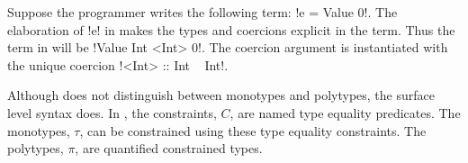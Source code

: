 \documentclass[screen,nonacm,manuscript,review]{acmart} %
\begin{document}
Suppose the programmer writes the following term: !e = Value 0!.
The elaboration of !e! in \SFC makes the types and coercions explicit in the term.
Thus the term in \SFC will be !Value Int <Int> 0!. The coercion argument
is instantiated with the unique coercion !<Int> :: Int ~ Int!.

Although \SFC does not distinguish
between monotypes and polytypes, the surface level syntax does.
In , the constraints, $C$, are named type equality
predicates. The monotypes, $\tau$, can be constrained using these type
equality constraints. The polytypes, $\pi$, are quantified constrained types.

\newcommand\GADTVar{
 \ib{\irule[\trule{g-var}]
 {x\co\pi \in \TEnv};
 {\GTranslate C \TEnv x {\pi} x}
 }
}
\newcommand\GADTEq{
 \ib{\irule[\trule{g-eq}]
 {\GTranslate C \TEnv \Tm \tau \Tm'}
 {\CoKinding C \Co {\tau \sim \tau'}};
 {\GTranslate C \TEnv \Tm {\tau'} {\Cast {\Tm'} \Co}}
 }
}
\newcommand\GADTForallI{
 \ib{\irule[\trule{g-$\I\forall$}]
 {\GTranslate C \TEnv \Tm \pi \Tm'}
 {\fresh \TyVar {C, \TEnv}};
 {\GTranslate C \TEnv \Tm {\Forall {\TyVar\co\star} \pi} {\TLam {\TyVar\co\star} \Tm'}}
 }
}
\newcommand\GADTForallE{
 \ib{\irule[\trule{g-$\E\forall$}]
 {\GTranslate C \TEnv \Tm {\Forall {\TyVar\co\star} \pi} \Tm'};
 {\GTranslate C \TEnv \Tm {\Set{\TyVar\mapsto\tau}\pi} {\Tm'\App \tau}}
 }
}
\newcommand\GADTCI{
 \ib{\irule[\trule{g-$\I C$}]
 {\GTranslate {C,c:\tau\sim\tau'} \TEnv \Tm {\eta} \Tm'};
 {\GTranslate C \TEnv \Tm {\tau\sim\tau'\then\eta} {\TLam {(c\co\tau\sim\tau')} \Tm'}}
 }
}
\newcommand\GADTCE{
 \ib{\irule[\trule{g-$\E C$}]
 {\GTranslate {C} \TEnv \Tm {\tau\sim\tau'\then\eta} \Tm'}
 {\CoKinding C \Co \tau\sim\tau'};
 {\GTranslate C \TEnv \Tm {\eta} {\Tm'\App\Co}}
 }
}
\newcommand\GADTAlt{
 \ib{\irule[\trule{g-alt}]
 {\substack{
 \mathlarger{H\co \Forall {\many\TyVar} {\Forall {\many\beta} {\many{\tau'\sim\tau''} \then \many\tau \to T\many\TyVar}}}\quad
 \mathlarger{\many\TyVar \cap \many\beta = \varnothing}\quad
 \mathlarger{\fvs{\many\tau, \many{\tau'}, \many{\tau''}} = \fvs{\many\TyVar, \many\beta}}\quad
 \mathlarger{\Subst = \Set{\many{\TyVar\mapsto v}}}\quad
 \mathlarger{\fresh {\many{c}} {C, \TEnv}}\\
 \mathlarger{\GTranslate {C,\many{c\co\Subst{\tau'}\sim\Subst\tau''}\,} {\,\TEnv,\many{x\co\Subst\tau}\,} \Tm {\tau'} \Tm'} }};
 {\GTranslate C \TEnv {H\App\many x \to \Tm} {T\App\many v \to \tau'}
 {H\App(\many{\beta\co\star})\App(\many{c\co\Subst\tau'\sim\Subst\tau''})\App(\many{x\co\Subst\tau}) \to \Tm' }}
 }
}
\end{document}
